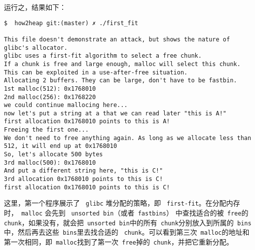 运行之，结果如下：

\begin{verbatim}
$  how2heap git:(master) ✗ ./first_fit

This file doesn't demonstrate an attack, but shows the nature of glibc's allocator.
glibc uses a first-fit algorithm to select a free chunk.
If a chunk is free and large enough, malloc will select this chunk.
This can be exploited in a use-after-free situation.
Allocating 2 buffers. They can be large, don't have to be fastbin.
1st malloc(512): 0x1768010
2nd malloc(256): 0x1768220
we could continue mallocing here...
now let's put a string at a that we can read later "this is A!"
first allocation 0x1768010 points to this is A!
Freeing the first one...
We don't need to free anything again. As long as we allocate less than 512, it will end up at 0x1768010
So, let's allocate 500 bytes
3rd malloc(500): 0x1768010
And put a different string here, "this is C!"
3rd allocation 0x1768010 points to this is C!
first allocation 0x1768010 points to this is C!
\end{verbatim}

这里，第一个程序展示了 \verb+ glibc+ 堆分配的策略，即 \verb+ first-fit+。在分配内存时，\verb+ malloc+ 会先到 \verb+ unsorted bin+（或者\verb+ fastbins+） 中查找适合的被\verb+ free+的\verb+ chunk+，如果没有，就会把\verb+ unsorted bin+中的所有\verb+ chunk+分别放入到所属的\verb+ bins+中，然后再去这些\verb+ bins+里去找合适的 \verb+ chunk+。可以看到第三次\verb+ malloc+的地址和第一次相同，即\verb+ malloc+找到了第一次\verb+ free+掉的\verb+ chunk+，并把它重新分配。


